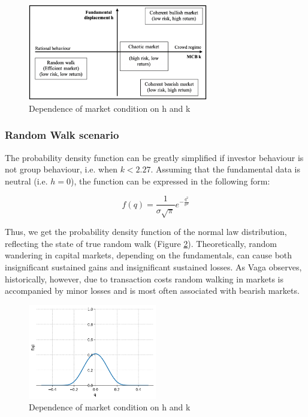 \begin{figure}[h!]
  \includegraphics[width=0.7\textwidth]{figures/market_phases.png}
  \centering
  \caption{Dependence of market condition on h and k}
  \label{fig:market_phases}
\end{figure}
\newpage

\subsubsection*{Random Walk scenario}

The probability density function  can be greatly simplified if investor behaviour is not group behaviour, i.e. when $k < 2.27$. Assuming that the fundamental data is neutral (i.e. $h=0$), the function can be expressed in the following form:  

\begin{equation}
	f(q) = \frac{1}{\sigma \sqrt{\pi}} e^{-\frac{q^2}{\sigma^2}}
\end{equation}


Thus, we get the probability density function of the normal law distribution, reflecting the state of 	true random walk (Figure \ref{fig:random_market}). Theoretically, random wandering in capital markets, depending on the fundamentals, can cause both insignificant sustained gains and insignificant sustained losses. As Vaga observes, historically, however, due to transaction costs random walking in markets is accompanied by minor losses and is most often associated with bearish markets.


\begin{figure}[h!]
  \includegraphics[width=0.5\textwidth]{figures/random_market.png}
  \centering
  \caption{Dependence of market condition on h and k}
  \label{fig:random_market}
\end{figure}

